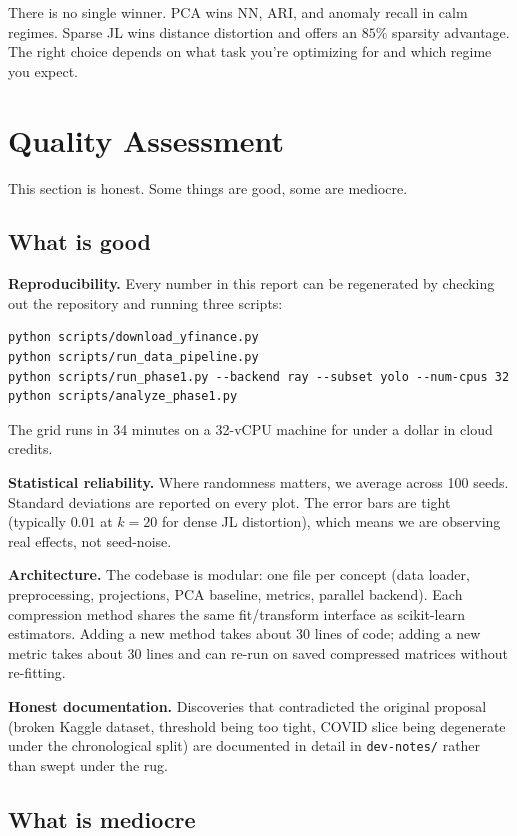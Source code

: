 \documentclass[11pt]{article}
\begin{document}
There is no single winner. PCA wins NN, ARI, and anomaly recall in calm regimes. Sparse JL wins distance distortion and offers an $85\%$ sparsity advantage. The right choice depends on what task you're optimizing for and which regime you expect.

\newpage

\section{Quality Assessment}

This section is honest. Some things are good, some are mediocre.

\subsection{What is good}

\textbf{Reproducibility.} Every number in this report can be regenerated by checking out the repository and running three scripts:
\begin{verbatim}
python scripts/download_yfinance.py
python scripts/run_data_pipeline.py
python scripts/run_phase1.py --backend ray --subset yolo --num-cpus 32
python scripts/analyze_phase1.py
\end{verbatim}
The grid runs in 34 minutes on a 32-vCPU machine for under a dollar in cloud credits.

\textbf{Statistical reliability.} Where randomness matters, we average across 100 seeds. Standard deviations are reported on every plot. The error bars are tight (typically $0.01$ at $k=20$ for dense JL distortion), which means we are observing real effects, not seed-noise.

\textbf{Architecture.} The codebase is modular: one file per concept (data loader, preprocessing, projections, PCA baseline, metrics, parallel backend). Each compression method shares the same fit/transform interface as scikit-learn estimators. Adding a new method takes about 30 lines of code; adding a new metric takes about 30 lines and can re-run on saved compressed matrices without re-fitting.

\textbf{Honest documentation.} Discoveries that contradicted the original proposal (broken Kaggle dataset, threshold being too tight, COVID slice being degenerate under the chronological split) are documented in detail in \texttt{dev-notes/} rather than swept under the rug.

\subsection{What is mediocre}
\end{document}
